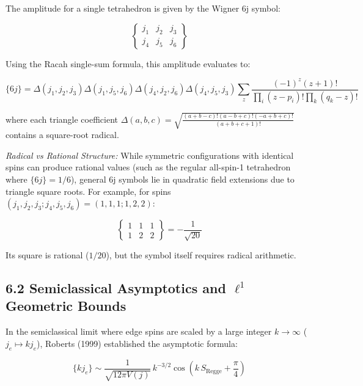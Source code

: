 \documentclass[11pt]{article}
\begin{document}
The amplitude for a single tetrahedron is given by the Wigner 6j symbol:

\begin{equation*}
\left\{ \begin{matrix} j_1 & j_2 & j_3 \\ j_4 & j_5 & j_6 \end{matrix} \right\}
\end{equation*}

Using the Racah single-sum formula, this amplitude evaluates to:

\begin{equation*}
\{6j\} = \Delta(j_1, j_2, j_3)\Delta(j_1, j_5, j_6)\Delta(j_4, j_2, j_6)\Delta(j_4, j_5, j_3) \sum_z \frac{(-1)^z (z+1)!}{\prod_i (z - p_i)! \prod_k (q_k - z)!}
\end{equation*}

where each triangle coefficient $\Delta(a, b, c) = \sqrt{\frac{(a+b-c)!(a-b+c)!(-a+b+c)!}{(a+b+c+1)!}}$ contains a square-root radical.

\emph{Radical vs Rational Structure:} While symmetric configurations with identical spins can produce rational values (such as the regular all-spin-1 tetrahedron where $\{6j\} = 1/6$), general 6j symbols lie in quadratic field extensions due to triangle square roots. For example, for spins $(j_1, j_2, j_3; j_4, j_5, j_6) = (1, 1, 1; 1, 2, 2)$:

\begin{equation*}
\left\{ \begin{matrix} 1 & 1 & 1 \\ 1 & 2 & 2 \end{matrix} \right\} = -\frac{1}{\sqrt{20}}
\end{equation*}

Its square is rational ($1/20$), but the symbol itself requires radical arithmetic.

\subsection{\texorpdfstring{6.2 Semiclassical Asymptotics and $\ell^1$ Geometric Bounds}{6.2 Semiclassical Asymptotics and ℓ¹ Geometric Bounds}}

In the semiclassical limit where edge spins are scaled by a large integer $k \to \infty$ ($j_e \mapsto k j_e$), Roberts (1999) established the asymptotic formula:

\begin{equation*}
\{k j_e\} \sim \frac{1}{\sqrt{12\pi V(j)}} \, k^{-3/2} \cos\left( k \, S_{\mathrm{Regge}} + \frac{\pi}{4} \right)
\end{equation*}
\end{document}
